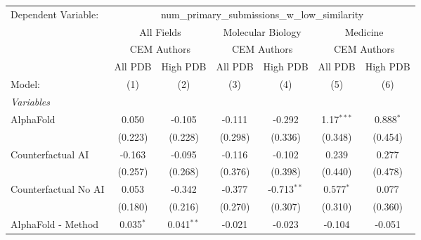 \begingroup
\centering
\begin{tabular}{lcccccc}
   \tabularnewline \midrule \midrule
   Dependent Variable: & \multicolumn{6}{c}{num\_primary\_submissions\_w\_low\_similarity}\\
 & \multicolumn{2}{c}{All Fields} & \multicolumn{2}{c}{Molecular Biology} & \multicolumn{2}{c}{Medicine} \\
\cmidrule(lr){2-3} \cmidrule(lr){4-5} \cmidrule(lr){6-7}
 & \multicolumn{2}{c}{CEM Authors} & \multicolumn{2}{c}{CEM Authors} & \multicolumn{2}{c}{CEM Authors} \\
\cmidrule(lr){2-3} \cmidrule(lr){4-5} \cmidrule(lr){6-7}
 & \multicolumn{1}{c}{All PDB} & \multicolumn{1}{c}{High PDB} & \multicolumn{1}{c}{All PDB} & \multicolumn{1}{c}{High PDB} & \multicolumn{1}{c}{All PDB} & \multicolumn{1}{c}{High PDB} \\
\cmidrule(lr){2-2} \cmidrule(lr){3-3} \cmidrule(lr){4-4} \cmidrule(lr){5-5} \cmidrule(lr){6-6} \cmidrule(lr){7-7}
   Model:                                                     & (1)          & (2)          & (3)           & (4)           & (5)           & (6)\\  
   \midrule
   \emph{Variables}\\
   AlphaFold                                                  & 0.050        & -0.105       & -0.111        & -0.292        & 1.17$^{***}$  & 0.888$^{*}$\\   
                                                              & (0.223)      & (0.228)      & (0.298)       & (0.336)       & (0.348)       & (0.454)\\   
   Counterfactual AI                                          & -0.163       & -0.095       & -0.116        & -0.102        & 0.239         & 0.277\\   
                                                              & (0.257)      & (0.268)      & (0.376)       & (0.398)       & (0.440)       & (0.478)\\   
   Counterfactual No AI                                       & 0.053        & -0.342       & -0.377        & -0.713$^{**}$ & 0.577$^{*}$   & 0.077\\   
                                                              & (0.180)      & (0.216)      & (0.270)       & (0.307)       & (0.310)       & (0.360)\\   
   AlphaFold - Method                                         & 0.035$^{*}$  & 0.041$^{**}$ & -0.021        & -0.023        & -0.104        & -0.051\\   

\end{tabular}
